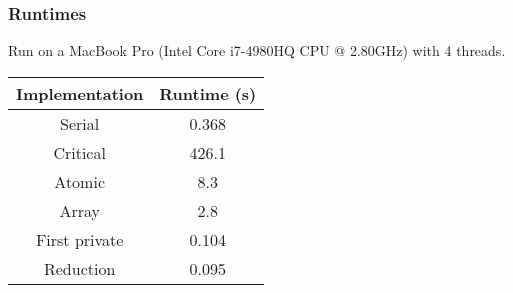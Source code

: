 \documentclass{beamer}
\begin{document}
\begin{frame}
\frametitle{Runtimes}
Run on a MacBook Pro (Intel Core i7-4980HQ CPU @ 2.80GHz) with 4 threads.

\begin{table}
\begin{tabular}{cc}
\toprule
Implementation & Runtime (s) \\
\midrule
Serial        & 0.368 \\
Critical      & 426.1 \\
Atomic        & 8.3 \\
Array         & 2.8 \\
First private & 0.104 \\
Reduction     & 0.095 \\
\bottomrule
\end{tabular}
\end{table}
\end{frame}

\end{document}
